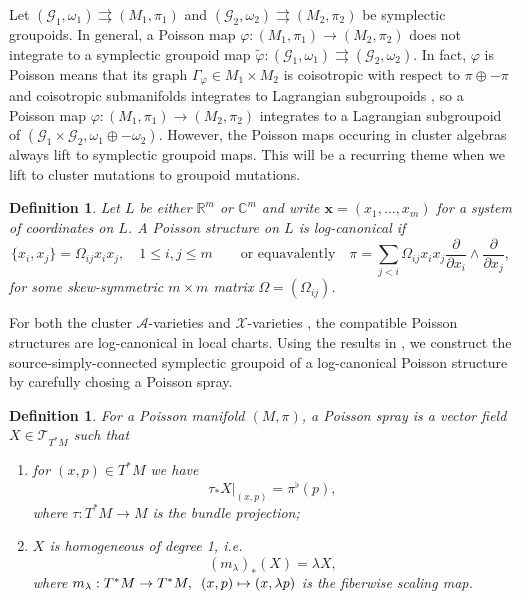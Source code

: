 \documentclass{amsart}
\newtheorem{definition}[theorem]{Definition}
\numberwithin{equation}{section}
\newcommand{\bfx}{\mathbf{x}}
\newcommand{\cA}{\mathcal{A}}
\newcommand{\cG}{\mathcal{G}}
\newcommand{\cX}{\mathcal{X}}
\newcommand{\cT}{\mathcal{T}}
\newcommand{\CC}{\mathbb{C}}
\newcommand{\RR}{\mathbb{R}}
\newcommand{\rra}{\rightrightarrows}
\begin{document}
Let $(\cG_1, \omega_1) \rra (M_1, \pi_1)$ and $(\cG_2, \omega_2) \rra (M_2, \pi_2)$ be symplectic groupoids. In general, a Poisson map $\varphi: (M_1, \pi_1) \to (M_2, \pi_2)$ does not integrate to a symplectic groupoid map $\tilde{\varphi}: (\cG_1, \omega_1) \rra (\cG_2, \omega_2)$. In fact, $\varphi$ is Poisson means that its graph $\Gamma_\varphi \in M_1 \times M_2$ is coisotropic with respect to $\pi \oplus -\pi$ \cite{MR959095} and coisotropic submanifolds integrates to Lagrangian subgroupoids \cite{MR2104442}, so a Poisson map $\varphi: (M_1, \pi_1) \to (M_2, \pi_2)$ integrates to a Lagrangian subgroupoid of $(\cG_1\times\cG_2, \omega_1\oplus-\omega_2)$. However, the Poisson maps occuring in cluster algebras always lift to symplectic groupoid maps. This will be a recurring theme when we lift to cluster mutations to groupoid mutations.

\begin{definition}
  Let $L$ be either $\RR^m$ or $\CC^m$ and write $\bfx = (x_1, \ldots, x_m)$ for a system of coordinates on $L$.
  A Poisson structure on $L$ is \emph{log-canonical} if
  $$
    \{x_i, x_j\} = \Omega_{ij} x_ix_j, \quad 1 \leq i,j \leq m \qquad \text{or equavalently} \quad
    \pi = \sum_{j < i} \Omega_{ij} x_ix_j\frac{\partial}{\partial x_i} \wedge \frac{\partial}{\partial x_j},
  $$
  for some skew-symmetric $m\times m$ matrix $\Omega = (\Omega_{ij})$.
\end{definition}

For both the cluster $\cA$-varieties \cite{MR2683456} and $\cX$-varieties \cite{MR2470108}, the compatible Poisson structures are log-canonical in local charts.
Using the results in \cite{MR2900786, CMS17}, we construct the source-simply-connected symplectic groupoid of a log-canonical Poisson structure by carefully chosing a Poisson spray. 
\begin{definition} 
  \cite{MR2900786}
  For a Poisson manifold $(M, \pi)$, a \emph{Poisson spray} is a vector field $X \in \cT_{T^*M}$ such that
  \begin{enumerate}
    \item for $(x,p) \in T^*M$ we have
      \[\tau_* X|_{(x,p)} = \pi^\flat(p),\]
      where $\tau: T^*M \to M$ is the bundle projection;
    \item $X$ is homogeneous of degree 1, i.e.
      \[(m_\lambda)_*(X) = \lambda X,\]
      where $m_\lambda: T^*M \to T^*M, \enskip (x,p) \mapsto (x,\lambda p)$ is the fiberwise scaling map.
  \end{enumerate}
\end{definition}
\end{document}
